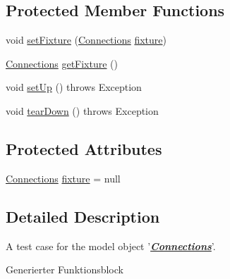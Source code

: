 \subsection*{Protected Member Functions}
\begin{DoxyCompactItemize}
\item 
void \hyperlink{classshootingmachineemfmodel_1_1tests_1_1_connections_test_adadf137c8bd8889e78da70273a64189d}{set\-Fixture} (\hyperlink{interfaceshootingmachineemfmodel_1_1_connections}{Connections} \hyperlink{classshootingmachineemfmodel_1_1tests_1_1_connections_test_abc7477fbf60d557d5e27a89c635f7bd7}{fixture})
\item 
\hyperlink{interfaceshootingmachineemfmodel_1_1_connections}{Connections} \hyperlink{classshootingmachineemfmodel_1_1tests_1_1_connections_test_a9c7e9d232dd7c044cb5fe3b7bc544ff5}{get\-Fixture} ()
\item 
void \hyperlink{classshootingmachineemfmodel_1_1tests_1_1_connections_test_ac367b982799447ec0244a80637899599}{set\-Up} ()  throws Exception 
\item 
void \hyperlink{classshootingmachineemfmodel_1_1tests_1_1_connections_test_a1f25d3a18e600f388d04259fc6092a7e}{tear\-Down} ()  throws Exception 
\end{DoxyCompactItemize}
\subsection*{Protected Attributes}
\begin{DoxyCompactItemize}
\item 
\hyperlink{interfaceshootingmachineemfmodel_1_1_connections}{Connections} \hyperlink{classshootingmachineemfmodel_1_1tests_1_1_connections_test_abc7477fbf60d557d5e27a89c635f7bd7}{fixture} = null
\end{DoxyCompactItemize}


\subsection{Detailed Description}
A test case for the model object '{\itshape {\bfseries \hyperlink{interfaceshootingmachineemfmodel_1_1_connections}{Connections}}}'.

Generierter Funktionsblock 

